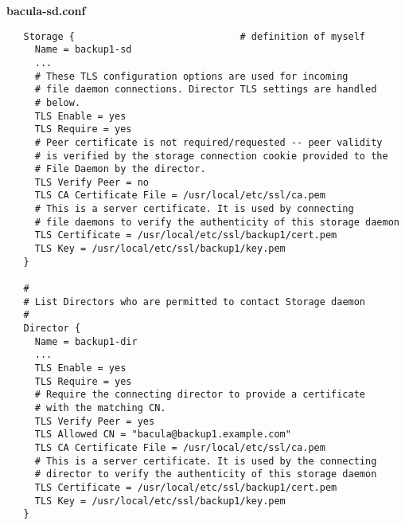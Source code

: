 {\bf bacula-sd.conf}
\footnotesize
\begin{verbatim}
   Storage {                             # definition of myself
     Name = backup1-sd
     ...
     # These TLS configuration options are used for incoming
     # file daemon connections. Director TLS settings are handled
     # below.
     TLS Enable = yes
     TLS Require = yes
     # Peer certificate is not required/requested -- peer validity
     # is verified by the storage connection cookie provided to the
     # File Daemon by the director.
     TLS Verify Peer = no
     TLS CA Certificate File = /usr/local/etc/ssl/ca.pem
     # This is a server certificate. It is used by connecting
     # file daemons to verify the authenticity of this storage daemon
     TLS Certificate = /usr/local/etc/ssl/backup1/cert.pem
     TLS Key = /usr/local/etc/ssl/backup1/key.pem
   }

   #
   # List Directors who are permitted to contact Storage daemon
   #
   Director {
     Name = backup1-dir
     ...
     TLS Enable = yes
     TLS Require = yes
     # Require the connecting director to provide a certificate
     # with the matching CN.
     TLS Verify Peer = yes
     TLS Allowed CN = "bacula@backup1.example.com"
     TLS CA Certificate File = /usr/local/etc/ssl/ca.pem
     # This is a server certificate. It is used by the connecting
     # director to verify the authenticity of this storage daemon
     TLS Certificate = /usr/local/etc/ssl/backup1/cert.pem
     TLS Key = /usr/local/etc/ssl/backup1/key.pem
   }
\end{verbatim}
\normalsize
